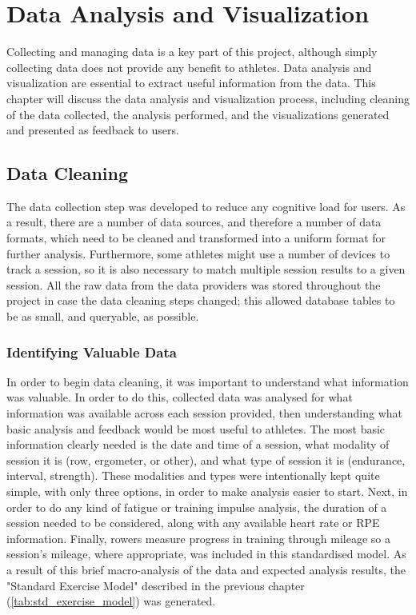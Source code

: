 \chapter{\label{ch:data-anyl-viz}Data Analysis and Visualization}
Collecting and managing data is a key part of this project, although simply collecting data does not provide any benefit to athletes. Data analysis and visualization are essential to extract useful information from the data. This chapter will discuss the data analysis and visualization process, including cleaning of the data collected, the analysis performed, and the visualizations generated and presented as feedback to users.

\section{\label{sec:data-cleaning}Data Cleaning}
The data collection step was developed to reduce any cognitive load for users. As a result, there are a number of data sources, and therefore a number of data formats, which need to be cleaned and transformed into a uniform format for further analysis. Furthermore, some athletes might use a number of devices to track a session, so it is also necessary to match multiple session results to a given session. All the raw data from the data providers was stored throughout the project in case the data cleaning steps changed; this allowed database tables to be as small, and queryable, as possible.
\subsection{Identifying Valuable Data}
In order to begin data cleaning, it was important to understand what information was valuable. In order to do this, collected data was analysed for what information was available across each session provided, then understanding what basic analysis and feedback would be most useful to athletes. The most basic information clearly needed is the date and time of a session, what modality of session it is (row, ergometer, or other), and what type of session it is (endurance, interval, strength). These modalities and types were intentionally kept quite simple, with only three options, in order to make analysis easier to start. Next, in order to do any kind of fatigue or training impulse analysis, the duration of a session needed to be considered, along with any available heart rate or RPE information. Finally, rowers measure progress in training through mileage so a session's mileage, where appropriate, was included in this standardised model. As a result of this brief macro-analysis of the data and expected analysis results, the "Standard Exercise Model" described in the previous chapter (\autoref{tab:std_exercise_model}) was generated.

